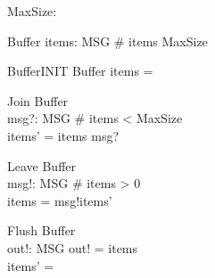 \documentclass{article}
\begin{document}
\begin{zed}
  [MSG]
\end{zed}

\begin{axdef}
  MaxSize: \nat
\end{axdef}

\begin{schema}{Buffer}
  items: \seq  MSG
\where
  \# items \leq  MaxSize
\end{schema}

\begin{schema}{BufferINIT}
  Buffer
\where
  items = \langle \rangle
\end{schema}


\begin{schema}{Join}
  \Delta Buffer\\
  msg?: MSG
\where
  \# items < MaxSize\\
  items' = items \cat  \langle msg?\rangle
\end{schema}


\begin{schema}{Leave}
  \Delta Buffer\\
  msg!: MSG
\where
  \# items > 0\\
  items = \langle msg!\rangle  \cat  items'
\end{schema}



\begin{schema}{Flush}
  \Delta Buffer\\
  out!: \seq  MSG
\where
  out! = items\\
  items' = \langle \rangle
\end{schema}
\end{document}

